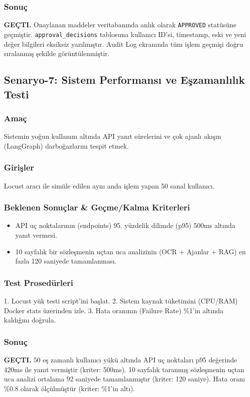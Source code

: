 \documentclass[12pt,a4paper]{article}
\begin{document}
\subsubsection{Sonuç}
\textbf{GEÇTI.} Onaylanan maddeler veritabanında anlık olarak \texttt{APPROVED} statüsüne geçmiştir. \texttt{approval\_decisions} tablosuna kullanıcı ID'si, timestamp, eski ve yeni değer bilgileri eksiksiz yazılmıştır. Audit Log ekranında tüm işlem geçmişi doğru sıralanmış şekilde görüntülenmiştir.

\subsection{Senaryo-7: Sistem Performansı ve Eşzamanlılık Testi}
\subsubsection{Amaç}
Sistemin yoğun kullanım altında API yanıt sürelerini ve çok ajanlı akışın (LangGraph) darboğazlarını tespit etmek.

\subsubsection{Girişler}
Locust aracı ile simüle edilen aynı anda işlem yapan 50 sanal kullanıcı.

\subsubsection{Beklenen Sonuçlar \& Geçme/Kalma Kriterleri}
\begin{itemize}
    \item API uç noktalarının (endpoints) 95. yüzdelik dilimde (p95) 500ms altında yanıt vermesi.
    \item 10 sayfalık bir sözleşmenin uçtan uca analizinin (OCR + Ajanlar + RAG) en fazla 120 saniyede tamamlanması.
\end{itemize}

\subsubsection{Test Prosedürleri}
1. Locust yük testi script'ini başlat. 
2. Sistem kaynak tüketimini (CPU/RAM) Docker stats üzerinden izle. 
3. Hata oranının (Failure Rate) \%1'in altında kaldığını doğrula.

\subsubsection{Sonuç}
\textbf{GEÇTI.} 50 eş zamanlı kullanıcı yükü altında API uç noktaları p95 değerinde 420ms ile yanıt vermiştir (kriter: 500ms). 10 sayfalık taranmış sözleşmenin uçtan uca analizi ortalama 92 saniyede tamamlanmıştır (kriter: 120 saniye). Hata oranı \%0.8 olarak ölçülmüştür (kriter: \%1'in altı).
\end{document}
